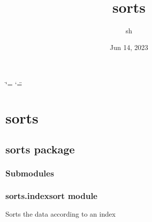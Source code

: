 \documentclass[letterpaper,10pt,english]{sphinxmanual}
\title{sorts}
\date{Jun 14, 2023}
\author{sh}
\begin{document}
\ifdefined\shorthandoff
  \ifnum\catcode`\=\string=\active\shorthandoff{=}\fi
  \ifnum\catcode`\"=\active{}\fi
\fi

\pagestyle{empty}
\sphinxmaketitle
\pagestyle{plain}
\sphinxtableofcontents
\pagestyle{normal}
\label{\detokenize{index::doc}}


\sphinxstepscope


\chapter{sorts}
\label{\detokenize{modules:sorts}}\label{\detokenize{modules::doc}}
\sphinxstepscope


\section{sorts package}
\label{\detokenize{sorts:sorts-package}}\label{\detokenize{sorts::doc}}

\subsection{Submodules}
\label{\detokenize{sorts:submodules}}

\subsection{sorts.indexsort module}
\label{\detokenize{sorts:module-sorts.indexsort}}\label{\detokenize{sorts:sorts-indexsort-module}}
\sphinxAtStartPar
Sorts the data according to an index
\end{document}
